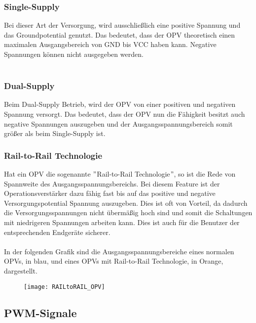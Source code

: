 \documentclass[titlepage,12pt,twoside]{article}
\begin{document}
\subsubsection{Single-Supply}
Bei dieser Art der Versorgung, wird ausschließlich eine positive Spannung und das Groundpotential genutzt. Das bedeutet, dass der OPV
theoretisch einen maximalen Ausgangsbereich von GND bis VCC haben kann. Negative Spannungen können nicht ausgegeben werden. \\
\\

\subsubsection{Dual-Supply}
Beim Dual-Supply Betrieb, wird der OPV von einer positiven und negativen Spannung versorgt. Das bedeutet, dass der OPV nun die Fähigkeit
besitzt auch negative Spannungen auszugeben und der Ausgangsspannungsbereich somit größer als beim Single-Supply ist.

\subsubsection{Rail-to-Rail Technologie}
Hat ein OPV die sogenannte $"$Rail-to-Rail Technologie$"$, so ist die Rede von Spannweite des Ausgangsspannungsbereichs. Bei diesem Feature
ist der Operationsverstärker dazu fähig fast bis auf das positive und negative Versorgungspotential Spannung auszugeben. Dies ist oft 
von Vorteil, da dadurch die Versorgungsspannungen nicht übermäßig hoch sind und somit die Schaltungen mit niedrigeren Spannungen arbeiten
kann. Dies ist auch für die Benutzer der entsprechenden Endgeräte sicherer.\\
\\
In der folgenden Grafik sind die Ausgangsspannungsbereiche eines normalen OPVs, in blau, und eines OPVs mit Rail-to-Rail Technologie,
in Orange, dargestellt. \\
\begin{figure}[H]
	\begin{center}
		\scalebox{1.2}
		{\texttt{[image: RAILtoRAIL\_OPV]}}
	\end{center}
\end{figure}

\subsection{PWM-Signale}
\end{document}
